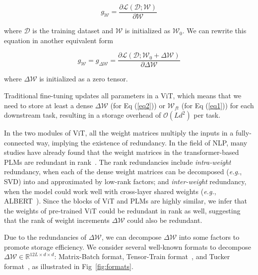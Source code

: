 \begin{equation}
g_{\boldsymbol{\mathcal{W}}} = \frac{\partial\mathcal{L}(\mathcal{D};\boldsymbol{\mathcal{W}})}{\partial\boldsymbol{\mathcal{W}}}
\label{eq1}
\end{equation}

where $\mathcal{D}$ is the training dataset and $\boldsymbol{\mathcal{W}}$ is initialized as $\boldsymbol{\mathcal{W}}_0$. We can rewrite this equation in another equivalent form

\begin{equation}
g_{\boldsymbol{\mathcal{W}}} = g_{\Delta\boldsymbol{\mathcal{W}}} = \frac{\partial\mathcal{L}(\mathcal{D};\boldsymbol{\mathcal{W}}_0+\Delta\boldsymbol{\mathcal{W}})}{\partial\Delta\boldsymbol{\mathcal{W}}}
\label{eq2}
\end{equation}

where $\Delta\boldsymbol{\mathcal{W}}$ is initialized as a zero tensor.

Traditional fine-tuning updates all parameters in a ViT, which means that we need to store at least a dense $\Delta\boldsymbol{\mathcal{W}}$ (for Eq (\ref{eq2})) or $\boldsymbol{\mathcal{W}}_{ft}$ (for Eq (\ref{eq1})) for each downstream task, resulting in a storage overhead of $\mathcal{O}(Ld^2)$ per task.

In the two modules of ViT, all the weight matrices multiply the inputs in a fully-connected way, implying the existence of redundancy. In the field of NLP, many studies have already found that the weight matrices in the transformer-based PLMs are redundant in rank~\cite{intra1,intra2,inter1,inter2}. The rank redundancies include \emph{intra-weight} redundancy, when each of the dense weight matrices can be decomposed (\emph{e.g.}, SVD) into and approximated by low-rank factors; and \emph{inter-weight} redundancy, when the model could work well with cross-layer shared weights (\emph{e.g.}, ALBERT~\cite{inter1}). Since the blocks of ViT and PLMs are highly similar, we infer that the weights of pre-trained ViT could be redundant in rank as well, suggesting that the rank of weight increments $\Delta\boldsymbol{\mathcal{W}}$ could also be redundant. 

Due to the redundancies of $\Delta\boldsymbol{\mathcal{W}}$, we can decompose $\Delta\boldsymbol{\mathcal{W}}$ into some factors to promote storage efficiency. We consider several well-known formats to decompose $\Delta\boldsymbol{\mathcal{W}}\in\mathbb{R}^{12L\times d\times d}$: Matrix-Batch format, Tensor-Train format~\cite{tt}, and Tucker format~\cite{tucker}, as illustrated in Fig~\ref{fig:formats}.

